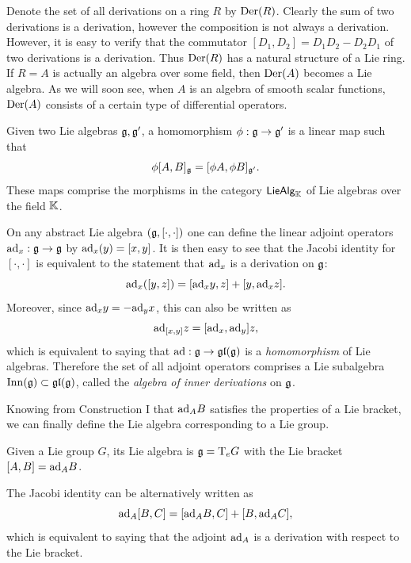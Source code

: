 \begin{example}
    Denote the set of all derivations on a ring $R$ by $\operatorname{Der}(R)$. Clearly the sum of two derivations is a derivation, however the composition is not always a derivation. However, it is easy to verify that the commutator $[D_1,D_2]=D_1D_2-D_2D_1$ of two derivations is a derivation. Thus $\operatorname{Der}(R)$ has a natural structure of a Lie ring. If $R=A$ is actually an algebra over some field, then $\operatorname{Der}(A)$ becomes a Lie algebra. As we will soon see, when $A$ is an algebra of smooth scalar functions, $\operatorname{Der}(A)$ consists of a certain type of differential operators.
\end{example}



\begin{defn}
    Given two Lie algebras $\mathfrak{g},\mathfrak{g}'$, a homomorphism $\phi:\mathfrak{g}\to\mathfrak{g}'$ is a linear map such that 
    \[\phi[A,B]_{\mathfrak{g}}=[\phi A,\phi B]_{\mathfrak{g}'}.\]
    These maps comprise the morphisms in the category $\mathsf{LieAlg}_{\mathbb{K}}$ of Lie algebras over the field $\mathbb{K}$.
\end{defn}


\begin{example}
    On any abstract Lie algebra $(\mathfrak{g},[\cdot,\cdot])$ one can define the linear adjoint operators $\mathrm{ad}_x:\mathfrak{g}\to\mathfrak{g}$ by $\mathrm{ad}_x(y)=[x,y]$. It is then easy to see that the Jacobi identity for $[\cdot,\cdot]$ is equivalent to the statement that $\mathrm{ad}_x$ is a derivation on $\mathfrak{g}$:
    \[\mathrm{ad}_x([y,z])=[\mathrm{ad}_x y,z]+[y,\mathrm{ad}_x z].\]
    Moreover, since $\mathrm{ad}_x y=-\mathrm{ad}_y x$, this can also be written as
    \[\mathrm{ad}_{[x,y]}z=[\mathrm{ad}_x,\mathrm{ad}_y]z,\]
    which is equivalent to saying that $\mathrm{ad}:\mathfrak{g}\to \mathfrak{gl}(\mathfrak{g})$ is a \emph{homomorphism} of Lie algebras. Therefore the set of all adjoint operators comprises a Lie subalgebra $\operatorname{Inn}(\mathfrak{g})\subset \mathfrak{gl}(\mathfrak{g})$, called the \emph{algebra of inner derivations} on $\mathfrak{g}$.
\end{example}



Knowing from Construction I that $\mathrm{ad}_A B$ satisfies the properties of a Lie bracket, we can finally define the Lie algebra corresponding to a Lie group.

\begin{defn}
    Given a Lie group $G$, its Lie algebra is $\mathfrak{g}=\mathrm{T}_e  G$ with the Lie bracket $[A,B]=\mathrm{ad}_A B$. 
    
    The Jacobi identity can be alternatively written as
    \[\mathrm{ad}_A[B,C]=[\mathrm{ad}_A B,C]+[B,\mathrm{ad}_A C],\]
    which is equivalent to saying that the adjoint $\mathrm{ad}_A$ is a derivation with respect to the Lie bracket. 
\end{defn}

